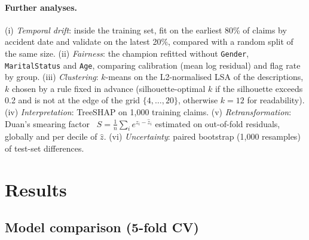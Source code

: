 \documentclass[10pt,twocolumn,letterpaper]{article}
\begin{document}
\paragraph{Further analyses.} (i) \emph{Temporal drift}: inside the training set, fit on the earliest 80\% of claims by
accident date and validate on the latest 20\%, compared with a random split of the same size. (ii) \emph{Fairness}: the
champion refitted without \texttt{Gender}, \texttt{MaritalStatus} and \texttt{Age}, comparing calibration (mean log
residual) and flag rate by group. (iii) \emph{Clustering}: $k$-means on the L2-normalised LSA of the descriptions, $k$
chosen by a rule fixed in advance (silhouette-optimal $k$ if the silhouette exceeds 0.2 and is not at the edge of the grid
$\{4,\dots,20\}$, otherwise $k=12$ for readability). (iv) \emph{Interpretation}: TreeSHAP on 1,000 training claims.
(v) \emph{Retransformation}: Duan's smearing factor~\cite{duan1983} $S=\frac1n\sum_i e^{z_i-\hat z_i}$ estimated on out-of-fold residuals,
globally and per decile of $\hat z$. (vi) \emph{Uncertainty}: paired bootstrap (1,000 resamples) of test-set differences.

\section{Results}
\subsection{Model comparison (5-fold CV)}
\end{document}

